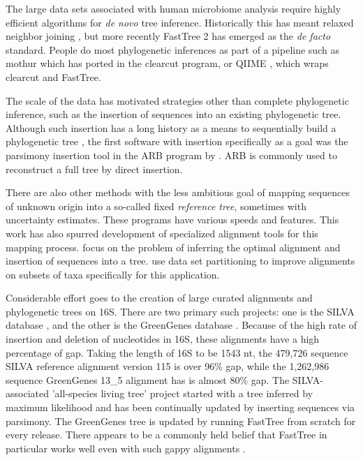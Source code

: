 \documentclass{amsart}
\begin{document}
The large data sets associated with human microbiome analysis require highly efficient algorithms for \emph{de novo} tree inference.
Historically this has meant relaxed neighbor joining \citep{evans2006relaxed}, but more recently FastTree 2 \citep{price2010fasttree} has emerged as the \textit{de facto} standard.
People do most phylogenetic inferences as part of a pipeline such as mothur \citep{schloss2009introducing} which has ported in the clearcut \citep{sheneman2006clearcut} program, or QIIME \citep{caporaso2010qiime}, which wraps clearcut and FastTree.

The scale of the data has motivated strategies other than complete phylogenetic inference, such as the insertion of sequences into an existing phylogenetic tree.
Although such insertion has a long history as a means to sequentially build a phylogenetic tree \citep{kluge1969quantitative}, the first software with insertion specifically as a goal was the parsimony insertion tool in the ARB program by \citet{ludwig2004arb}.
ARB is commonly used to reconstruct a full tree by direct insertion.

There are also other methods with the less ambitious goal of mapping sequences of unknown origin into a so-called fixed \textit{reference tree}, sometimes with uncertainty estimates.
These programs \citep{wu2008simple,monierEaLargeViruses08,vonMeringEaQuantitative08,stark2010mltreemap,matsen2010pplacer,berger2011performance} have various speeds and features.
This work has also spurred development of specialized alignment tools for this mapping process.
\citet{berger2011aligning} focus on the problem of inferring the optimal alignment and insertion of sequences into a tree.
\citet{mirarabsepp} use data set partitioning to improve alignments on subsets of taxa specifically for this application.

Considerable effort goes to the creation of large curated alignments and phylogenetic trees on 16S.
There are two primary such projects: one is the SILVA database \citep{pruesse2007silva,quast2013silva}, and the other is the GreenGenes database \citep{desantis2006greengenes,mcdonald2011improved}.
Because of the high rate of insertion and deletion of nucleotides in 16S, these alignments have a high percentage of gap.
Taking the length of 16S to be 1543 nt,
the 479,726 sequence SILVA reference alignment version 115 is over 96\% gap,
while the 1,262,986 sequence GreenGenes 13\_5 alignment has is almost 80\% gap.
The SILVA-associated 'all-species living tree' project \citep{yarza2008all} started with a tree inferred by maximum likelihood and has been continually updated  by inserting sequences via parsimony.
The GreenGenes tree is updated by running FastTree from scratch for every release.
There appears to be a commonly held belief that FastTree in particular works well even with such gappy alignments \citep[e.g.][]{sharpton2011phylotu}.
\end{document}
